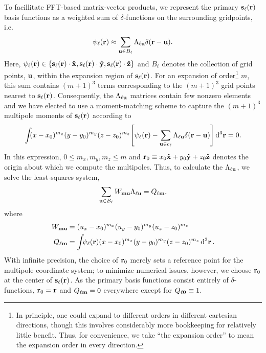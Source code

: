 To facillitate FFT-based matrix-vector products, we represent the primary $\vb{s}_\ell(\vb{r})$ basis functions as a weighted sum of $\delta$-functions on the surrounding gridpoints, i.e.
\begin{equation}
  \psi_\ell(\vb{r}) \approx \sum_{\vb{u} \in B_{\ell}} \Lambda_{\ell\vb{u}} \delta(\vb{r} - \vb{u}).
  \label{eq:grid linear combination}
\end{equation}
Here, $\psi_\ell(\vb{r}) \in \qty{\vb{s}_\ell(\vb{r})\cdot \vu{x}, \vb{s}_\ell(\vb{r}) \cdot \vu{y}, \vb{s}_\ell(\vb{r}) \cdot \vu{z}}$ and $B_\ell$ denotes the collection of grid points, $\vb{u}$, within the expansion region of $\vb{s}_\ell(\vb{r})$.
For an expansion of order\footnote{In principle, one could expand to different orders in different cartesian directions, though this involves considerably more bookkeeping for relatively little benefit. Thus, for convenience, we take ``the expansion order'' to mean the expansion order in every direction.} $m$, this sum contains $(m + 1)^3$ terms corresponding to the $(m + 1)^3$ grid points nearest to $\vb{s}_\ell(\vb{r})$.
Consequently, the $\Lambda_{\ell \vb{u}}$ matrices contain few nonzero elements and we have elected to use a moment-matching scheme to capture the $(m + 1)^3$ multipole moments of $\vb{s}_\ell(\vb{r})$ according to
\begin{equation}
  \int_{} \kern0.1em (x - x_0)^{m_x}(y - y_0)^{m_y}(z - z_0)^{m_z} \qty[\psi_\ell(\vb{r}) - \sum_{\vb{u} \in c_\ell}\Lambda_{\ell\vb{u}}\delta(\vb{r} - \vb{u})] \dd[3]{\vb{r}} = 0.
  \label{eq:moment matching}
\end{equation}
In this expression, $0 \leqslant m_x, m_y, m_z \leqslant m$ and $\vb{r}_0 \equiv x_0 \vu{x} + y_0 \vu{y} + z_0\vu{z}$ denotes the origin about which we compute the multipoles.
Thus, to calculate the $\Lambda_{\ell \vb{u}}$, we solve the least-squares system,
\begin{equation}
  \sum_{\vb{u} \in B_\ell} W_{\vb{m}\vb{u}}\Lambda_{\ell\vb{u}} = Q_{\ell\vb{m}},
  \label{eq:expansion matrix system}
\end{equation}
where
\begin{subequations}
  \begin{align}
    W_{\vb{m}\vb{u}} &= (u_x - x_0)^{m_x} (u_y - y_0)^{m_y} (u_z - z_0)^{m_z} \label{eq:w matrix} \\
    Q_{\ell \vb{m}} &= \int_{} \psi_\ell(\vb{r}) (x - x_0)^{m_x} (y - y_0)^{m_y} (z - z_0)^{m_z} \dd[3]{\vb{r}} \label{eq:q vector}.
  \end{align}
\end{subequations}
With infinite precision, the choice of $\vb{r}_0$ merely sets a reference point for the multipole coordinate system; to minimize numerical issues, however, we choose $\vb{r}_0$ at the center of $\vb{s}_\ell(\vb{r})$.
As the primary basis functions consist entirely of $\delta$-functions, $\vb{r}_0 = \vb{r}$ and $Q_{\ell\vb{m}} = 0$ everywhere except for $Q_{\ell \vb{0}} \equiv 1$.

